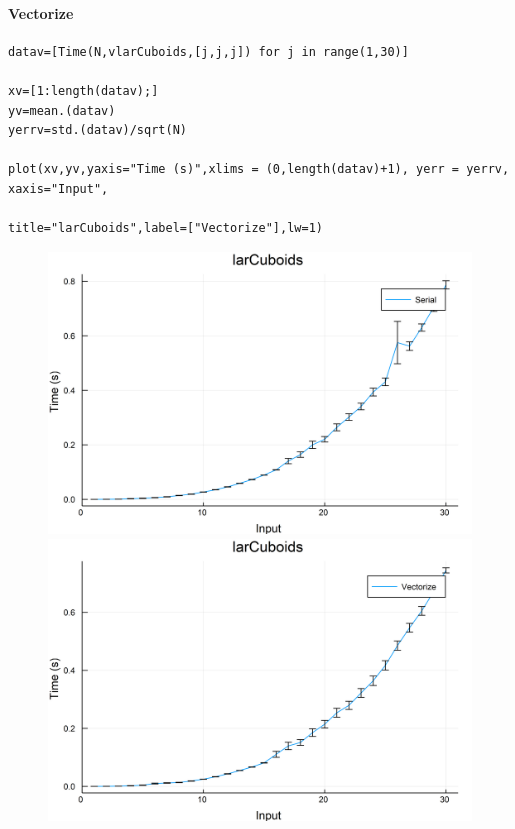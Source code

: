 \documentclass{article}
\begin{document}
\paragraph{Vectorize}
\begin{flushleft}\small
\begin{list}{}{} \item
    \begin{Verbatim}[tabsize=4]
datav=[Time(N,vlarCuboids,[j,j,j]) for j in range(1,30)]

xv=[1:length(datav);]
yv=mean.(datav)
yerrv=std.(datav)/sqrt(N)

plot(xv,yv,yaxis="Time (s)",xlims = (0,length(datav)+1), yerr = yerrv, xaxis="Input", 
                                                title="larCuboids",label=["Vectorize"],lw=1)
    \end{Verbatim}
\end{list}
\end{flushleft}

\begin{figure}[h!]
\centering
\includegraphics[scale=0.06]{larCuboidsSer.png}
\includegraphics[scale=0.06]{larCuboidsVec.png}
\end{figure}
\end{document}
